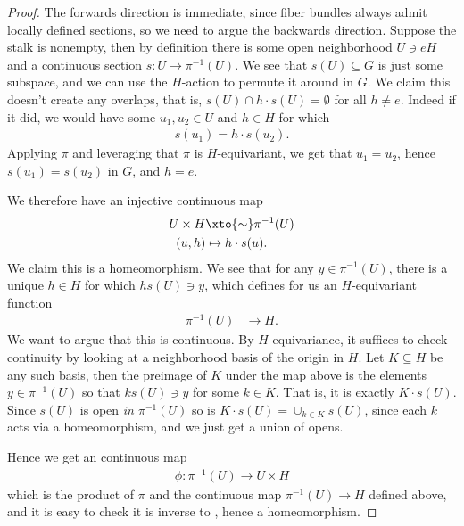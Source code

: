 \documentclass[11pt]{book}
\begin{document}
\begin{proof} The forwards direction is immediate, since fiber bundles always admit locally defined sections, so we need to argue the backwards direction. Suppose the stalk is nonempty, then by definition there is some open neighborhood $U \ni eH$ and a continuous section $s \colon U \to \pi^{-1}(U)$. We see that $s(U) \subseteq G$ is just some subspace, and we can use the $H$-action to permute it around in $G$. We claim this doesn't create any overlaps, that is, $s(U) \cap h\cdot s(U) = \emptyset$ for all $h\ne e$. Indeed if it did, we would have some $u_1,u_2\in U$ and $h\in H$ for which
\begin{align*}
    s(u_1) = h\cdot s(u_2).
\end{align*}
Applying $\pi$ and leveraging that $\pi$ is $H$-equivariant, we get that $u_1 = u_2$, hence $s(u_1) = s(u_2)$ in $G$, and $h= e$.

We therefore have an injective continuous map
\begin{equation}\label{eqn:UxH-to-piinvs-U}
\begin{aligned}
    U \times H &\xto{\sim} \pi^{-1}(U) \\
    (u,h) &\mapsto h\cdot s(u).
\end{aligned}
\end{equation}
We claim this is a homeomorphism. We see that for any $y\in \pi^{-1}(U)$, there is a unique $h\in H$ for which $hs(U) \ni y$, which defines for us an $H$-equivariant function
\begin{align*}
    \pi^{-1}(U) &\to H.
\end{align*}
We want to argue that this is continuous. By $H$-equivariance, it suffices to check continuity by looking at a neighborhood basis of the origin in $H$. Let $K \subseteq H$ be any such basis, then the preimage of $K$ under the map above is the elements $y\in \pi^{-1}(U)$ so that $ks(U) \ni y$ for some $k \in K$. That is, it is exactly $K\cdot s(U)$. Since $s(U)$ is open \emph{in $\pi^{-1}(U)$} so is $K\cdot s(U)= \cup_{k\in K}s(U)$, since each $k$ acts via a homeomorphism, and we just get a union of opens.

Hence we get an continuous map
\begin{align*}
    \phi \colon \pi^{-1}(U) \to U \times H
\end{align*}
which is the product of $\pi$ and the continuous map $\pi^{-1}(U) \to H$ defined above, and it is easy to check it is inverse to , hence a homeomorphism.


\end{proof}
\end{document}
